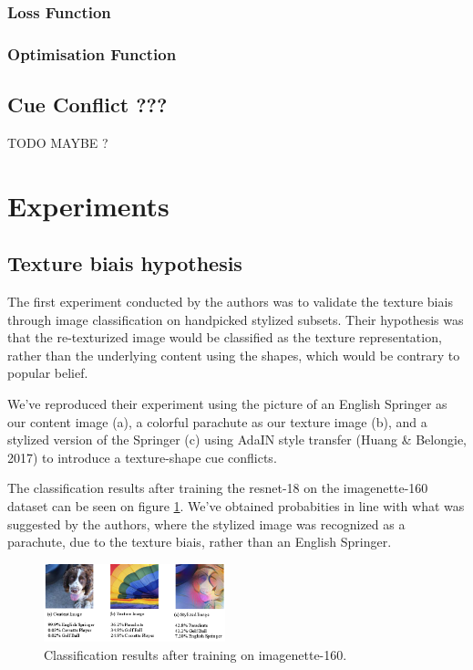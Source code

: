 \documentclass{article}
\begin{document}
\subsubsection{Loss Function}

\subsubsection{Optimisation Function}


\subsection{Cue Conflict ???}

TODO MAYBE ?

\newpage
\section{Experiments}

\subsection{Texture biais hypothesis}

The first experiment conducted by the authors was to validate the texture biais 
through image classification on handpicked stylized subsets. 
Their hypothesis was that the re-texturized image would be classified as the texture representation, rather than 
the underlying content using the shapes, which would be contrary to popular belief. \smallskip

\noindent
We've reproduced their experiment using the picture of an English Springer as our content image (a), 
a colorful parachute as our texture image (b),
and a stylized version of the Springer (c) using AdaIN style transfer 
(Huang \& Belongie, 2017) %
to introduce a texture-shape cue conflicts. \smallskip

\noindent
The classification results after training the resnet-18 on the imagenette-160 dataset 
can be seen on figure \ref{dog-parachute}.
We've obtained probabities in line with what was suggested by the authors, 
where the stylized image was recognized as a parachute, 
due to the texture biais, rather than an English Springer.

\begin{figure}[h!]\center
  \includegraphics[width=0.47\textwidth]{imgs/results-textures}
  \caption{Classification results after training on imagenette-160.}
  \label{dog-parachute}
\end{figure}
\end{document}
